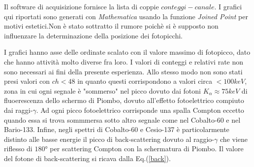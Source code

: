 \documentclass[12pt,a4paper,openright,twoside]{article}
\numberwithin{equation}{section} %
\begin{document}
Il software di acquisizione fornisce la lista di coppie $conteggi-canale$. I grafici qui riportati sono generati con \textit{Mathematica} usando la funzione \textit{Joined Point} per motivi estetici.Non è stato sottratto il rumore poichè si è supposto non influenzare la determinazione della posizione dei fotopicchi.

I grafici hanno asse delle ordinate scalato con il valore massimo di fotopicco, dato che hanno attività molto diverse fra loro. I valori di conteggi e relativi rate non sono necessari ai fini della presente esperienza. Allo stesso modo non sono stati presi valori con $ch<48$ in quanto questi corrispondono a valori circa $ < 100 keV$, zona in cui ogni segnale è "sommerso" nel picco dovuto dai fotoni $K_{\alpha} \approx 75 keV$ di fluoerescenza dello schermo di Piombo, dovuto all'effetto fotoelettrico compiuto dai raggi-$\gamma$. Ad ogni picco fotoelettrico corrisponde una spalla Compton eccetto quando essa si trova sommmersa sotto altro segnale come nel Cobalto-60 e nel Bario-133.
Infine, negli spettri di Cobalto-60 e Cesio-137 è particolarmente distinto alle basse energie il picco di back-scattering dovuto al raggio-$\gamma$ che viene riflesso di $180°$ per scattering Compton con la schermatura di Piombo. Il valore del fotone di back-scattering si ricava dalla Eq.(\ref{back}).
\end{document}

